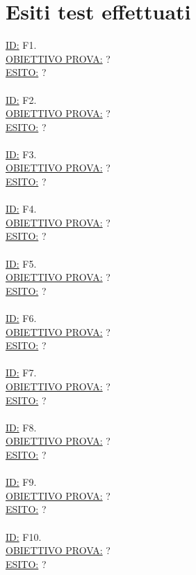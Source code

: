 \documentclass[11pt,titlepage,a4paper]{report}
\begin{document}
\section {Esiti test effettuati}
\underline{ID:} F1.   \\
\underline{OBIETTIVO PROVA:}  ?\\
\underline{ESITO:} ?\\
\\
\underline{ID:} F2.   \\
\underline{OBIETTIVO PROVA:}  ?\\
\underline{ESITO:} ?\\
\\
\underline{ID:} F3.   \\
\underline{OBIETTIVO PROVA:}  ?\\
\underline{ESITO:} ?\\
\\
\underline{ID:} F4.   \\
\underline{OBIETTIVO PROVA:}  ?\\
\underline{ESITO:} ?\\
\\
\underline{ID:} F5.   \\
\underline{OBIETTIVO PROVA:}  ?\\
\underline{ESITO:} ?\\
\\
\underline{ID:} F6.   \\
\underline{OBIETTIVO PROVA:}  ?\\
\underline{ESITO:} ?\\
\\
\underline{ID:} F7.   \\
\underline{OBIETTIVO PROVA:}  ?\\
\underline{ESITO:} ?\\
\\
\underline{ID:} F8.   \\
\underline{OBIETTIVO PROVA:}  ?\\
\underline{ESITO:} ?\\
\\
\underline{ID:} F9.   \\
\underline{OBIETTIVO PROVA:}  ?\\
\underline{ESITO:} ?\\
\\
\underline{ID:} F10.   \\
\underline{OBIETTIVO PROVA:}  ?\\
\underline{ESITO:} ?\\
\end{document}
